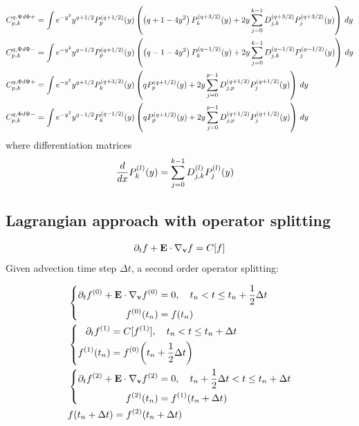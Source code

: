 \documentclass{article}[draft]
\begin{document}
\begin{align*}
C^{q,\Psi d\Phi+}_{p,k} 
&= \myint
e^{-y^2} y^{q+1/2} \maxp{q+1/2}{p}\of{y} \left( \left( q+1 - 4 y^2 \right) \maxp{q+3/2}{k}\of{y}
+ 2 y \sum_{j=0}^{k-1} \diffm{q+3/2}{j}{k} \maxp{q+3/2}{j}\of{y} \right)
\diff{y}
\\
C^{q,\Psi d\Phi-}_{p,k} 
&= \myint 
e^{-y^2} y^{q-1/2} \maxp{q+1/2}{p}\of{y} \left( \left( q-1 - 4 y^2 \right) \maxp{q-1/2}{k}\of{y}
+ 2 y \sum_{j=0}^{k-1} \diffm{q-1/2}{j}{k} \maxp{q-1/2}{j}\of{y} \right)
\diff{y}
\\
C^{q,\Phi d\Psi+}_{p,k} 
&= \myint 
e^{-y^2} y^{q+1/2} \maxp{q+3/2}{k}\of{y} 
\left( q \maxp{q+1/2}{p}\of{y}
+ 2 y \sum_{j=0}^{p-1} \diffm{q+1/2}{j}{p} \maxp{q+1/2}{j}\of{y} \right)
\diff{y}
\\
C^{q,\Phi d\Psi-}_{p,k} 
&= \myint 
e^{-y^2} y^{q-1/2} \maxp{q-1/2}{k}\of{y} 
\left( q \maxp{q+1/2}{p}\of{y}
+ 2 y \sum_{j=0}^{p-1} \diffm{q+1/2}{j}{p} \maxp{q+1/2}{j}\of{y} \right)
\diff{y}
\end{align*}
where differentiation  matrices
\begin{align*}
\frac{d}{dx} \maxp{l}{k} \of{y} &= \sum_{j=0}^{k-1} \diffm{l}{j}{k} \maxp{l}{j}\of{y}
\end{align*}

\clearpage
\subsection{Lagrangian approach with operator splitting}
\begin{align*}
\partial_t f + \mathbf{E}\cdot \nabla_{\mathbf{v}} f = C[f]
\end{align*}
Given advection time step $\Delta t$, a second order operator splitting:

\begin{align*}
&\left\{
\begin{aligned}
\partial_t f^{(0)} + \vect{E}\cdot \nabla_{\vect{v}} f^{(0)} &= 0, \quad t_n < t \leq t_n + \frac12 \Delta t \\
f^{(0)}\of{t_n} &= f\of{t_n}
\end{aligned}
\right.
\\
&\left\{
\begin{aligned}
\partial_t f^{(1)} &= C[f^{(1)}], \quad t_n < t \leq t_n + \Delta t \\
f^{(1)}\of{t_n} &= f^{(0)}\of{t_n + \frac12 \Delta t}
\end{aligned}
\right.
\\
&\left\{
\begin{aligned}
\partial_t f^{(2)} + \vect{E}\cdot \nabla_{\vect{v}} f^{(2)} &= 0, \quad t_n + \frac12 \Delta t < t \leq t_n + \Delta t  \\
f^{(2)}\of{t_n} &= f^{(1)}\of{t_n + \Delta t}
\end{aligned}
\right.
\\
& f\of{t_n + \Delta t} = f^{(2)}\of{t_n + \Delta t}
\end{align*}
\end{document}
